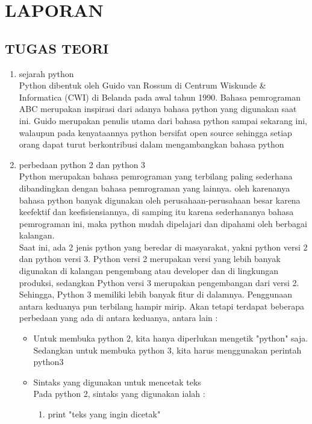 \chapter{LAPORAN}
\section{TUGAS TEORI}
\begin{enumerate}
	\item sejarah python\\
	Python dibentuk oleh Guido van Rossum di  Centrum Wiskunde \& Informatica (CWI) di Belanda pada awal tahun 1990. 	Bahasa pemrograman ABC merupakan inspirasi dari adanya bahasa python yang digunakan saat ini. Guido merupakan penulis utama dari bahasa python sampai sekarang ini, walaupun pada kenyataannya python bersifat open source sehingga setiap orang dapat turut berkontribusi dalam mengambangkan bahasa python
	\item perbedaan python 2 dan python 3\\
Python merupakan bahasa pemrograman yang terbilang paling sederhana dibandingkan dengan bahasa pemrograman yang lainnya. oleh karenanya bahasa python banyak digunakan oleh perusahaan-perusahaan besar karena keefektif dan keefisiensiannya, di samping itu karena sederhananya bahasa pemrograman ini, maka python mudah dipelajari dan dipahami oleh berbagai kalangan.\\
Saat ini, ada 2 jenis python yang beredar di masyarakat, yakni python versi 2 dan python versi 3. Python versi 2 merupakan versi yang lebih banyak digunakan di kalangan pengembang atau developer dan di lingkungan produksi, sedangkan Python versi 3 merupakan pengembangan dari versi 2. Sehingga, Python 3 memiliki lebih banyak fitur di dalamnya. Penggunaan antara keduanya pun terbilang hampir mirip. Akan tetapi terdapat beberapa perbedaan yang ada di antara keduanya, antara lain :\\
	\begin{itemize}
		\item Untuk membuka python 2, kita hanya diperlukan mengetik "python" saja. Sedangkan untuk membuka python 3, kita harus menggunakan perintah python3
		\item Sintaks yang digunakan untuk mencetak teks\\
		Pada python 2, sintaks yang digunakan ialah :\\
			\begin{enumerate}
			\item print "teks yang ingin dicetak"\\

\end{enumerate}
\end{itemize}
\end{enumerate}
